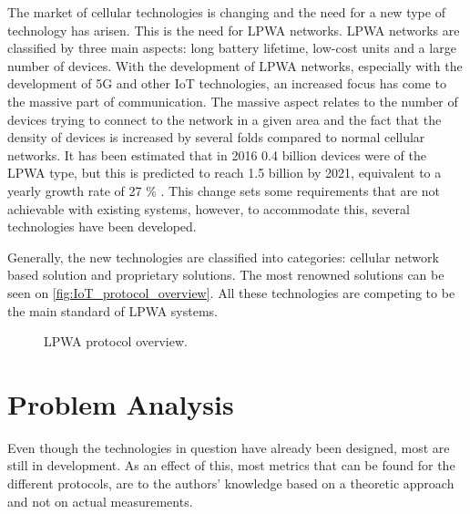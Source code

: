 The market of cellular technologies is changing and the need for a new type of technology has arisen. This is the need for \gls{LPWA} networks. \gls{LPWA} networks are classified by three main aspects: long battery lifetime, low-cost units and a large number of devices. With the development of \gls{LPWA} networks, especially with the development of 5G and other \gls{IoT} technologies, an increased focus has come to the massive part of communication. The massive aspect relates to the number of devices trying to connect to the network in a given area and the fact that the density of devices is increased by several folds compared to normal cellular networks. It has been estimated that in 2016 0.4 billion devices were of the \gls{LPWA} type, but this is predicted to reach 1.5 billion by 2021, equivalent to a yearly growth rate of 27 \% \citep{mobi-report}. This change sets some requirements that are not achievable with existing systems, however, to accommodate this, several technologies have been developed.


Generally, the new technologies are classified into categories: cellular network based solution and proprietary solutions. The most renowned solutions can be seen on \autoref{fig:IoT_protocol_overview}. All these technologies are competing to be the main standard of LPWA systems. 

\begin{figure}[H]
\centering
\caption{LPWA protocol overview.}
\label{fig:IoT_protocol_overview}
\end{figure}



\section{Problem Analysis}

Even though the technologies in question have already been designed, most are still in development. As an effect of this, most metrics that can be found for the different protocols, are to the authors' knowledge based on a theoretic approach and not on actual measurements. 

